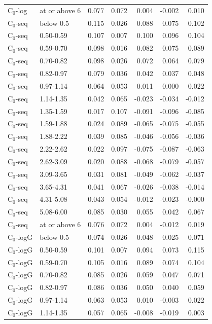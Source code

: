 \begin{longtable}{llrrrrr}
C$_0$-log & at or above 6 & 0.077 & 0.072 & 0.004 & -0.002 & 0.010 \\
C$_0$-seq & below 0.5 & 0.115 & 0.026 & 0.088 & 0.075 & 0.102 \\
C$_0$-seq & 0.50-0.59 & 0.107 & 0.007 & 0.100 & 0.096 & 0.104 \\
C$_0$-seq & 0.59-0.70 & 0.098 & 0.016 & 0.082 & 0.075 & 0.089 \\
C$_0$-seq & 0.70-0.82 & 0.098 & 0.026 & 0.072 & 0.064 & 0.079 \\
C$_0$-seq & 0.82-0.97 & 0.079 & 0.036 & 0.042 & 0.037 & 0.048 \\
C$_0$-seq & 0.97-1.14 & 0.064 & 0.053 & 0.011 & 0.000 & 0.022 \\
C$_0$-seq & 1.14-1.35 & 0.042 & 0.065 & -0.023 & -0.034 & -0.012 \\
C$_0$-seq & 1.35-1.59 & 0.017 & 0.107 & -0.091 & -0.096 & -0.085 \\
C$_0$-seq & 1.59-1.88 & 0.024 & 0.089 & -0.065 & -0.075 & -0.055 \\
C$_0$-seq & 1.88-2.22 & 0.039 & 0.085 & -0.046 & -0.056 & -0.036 \\
C$_0$-seq & 2.22-2.62 & 0.022 & 0.097 & -0.075 & -0.087 & -0.063 \\
C$_0$-seq & 2.62-3.09 & 0.020 & 0.088 & -0.068 & -0.079 & -0.057 \\
C$_0$-seq & 3.09-3.65 & 0.031 & 0.081 & -0.049 & -0.062 & -0.037 \\
C$_0$-seq & 3.65-4.31 & 0.041 & 0.067 & -0.026 & -0.038 & -0.014 \\
C$_0$-seq & 4.31-5.08 & 0.043 & 0.054 & -0.012 & -0.023 & -0.000 \\
C$_0$-seq & 5.08-6.00 & 0.085 & 0.030 & 0.055 & 0.042 & 0.067 \\
C$_0$-seq & at or above 6 & 0.076 & 0.072 & 0.004 & -0.012 & 0.019 \\
C$_0$-logG & below 0.5 & 0.074 & 0.026 & 0.048 & 0.025 & 0.071 \\
C$_0$-logG & 0.50-0.59 & 0.101 & 0.007 & 0.094 & 0.073 & 0.115 \\
C$_0$-logG & 0.59-0.70 & 0.105 & 0.016 & 0.089 & 0.074 & 0.104 \\
C$_0$-logG & 0.70-0.82 & 0.085 & 0.026 & 0.059 & 0.047 & 0.071 \\
C$_0$-logG & 0.82-0.97 & 0.086 & 0.036 & 0.050 & 0.040 & 0.059 \\
C$_0$-logG & 0.97-1.14 & 0.063 & 0.053 & 0.010 & -0.003 & 0.022 \\
C$_0$-logG & 1.14-1.35 & 0.057 & 0.065 & -0.008 & -0.019 & 0.003 \\

\end{longtable}
